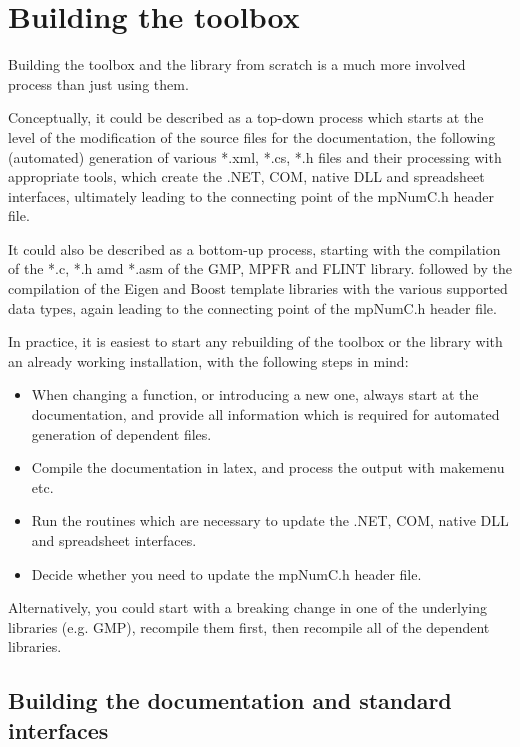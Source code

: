 \chapter{Building the toolbox} 

Building the toolbox and the library from scratch is a much more involved process than just using them. 

Conceptually, it could be described as a top-down process which starts at the level of the modification of the source files for the documentation, the following (automated) generation of various *.xml, *.cs, *.h files and their processing with appropriate tools, which create the .NET, COM, native DLL and spreadsheet interfaces, ultimately leading to the connecting point of the mpNumC.h header file.

It could also be described as a bottom-up process, starting with the compilation of the *.c, *.h amd *.asm of the GMP, MPFR and FLINT library. followed by the compilation of the Eigen and Boost template libraries with the various supported data types, again leading  to the connecting point of the mpNumC.h header file.

In practice, it is easiest to start any rebuilding of the toolbox or the library with an already working installation, with the following steps in mind:

\begin{itemize}
	\item When changing a function, or introducing a new one, always start at the documentation, and provide all information which is required for automated generation of dependent files.
	\item Compile the documentation in latex, and process the output with makemenu etc.
	\item Run the routines which are necessary to update the .NET, COM, native DLL and spreadsheet interfaces.
	\item Decide whether you need to update the mpNumC.h header file.
\end{itemize}

Alternatively, you could start with a breaking change in one of the underlying libraries (e.g. GMP), recompile them first, then recompile all of the dependent libraries.


\newpage
\section{Building the documentation and standard interfaces}

